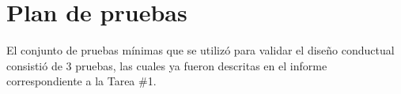 \section{Plan de pruebas}
El conjunto de pruebas mínimas que se utilizó para validar el diseño conductual consistió de 3 pruebas, las cuales ya fueron descritas en el informe correspondiente a la Tarea \#1.
